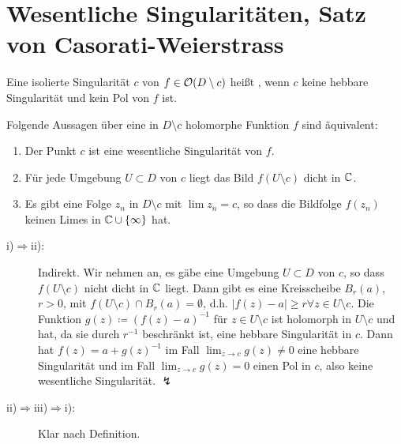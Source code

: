 \section{Wesentliche Singularit\"aten, Satz von Casorati-Weierstrass}
\begin{definition}
	Eine isolierte Singularit\"at $ c $ von $ f\in\mathcal O(D\setminus c) $ hei\ss t , wenn $ c $ keine hebbare Singularit\"at und kein Pol von $ f $ ist.
\end{definition}
\begin{satz}
	Folgende Aussagen \"uber eine in $ D\setminus c $ holomorphe Funktion $ f $ sind \"aquivalent:
	\begin{enumerate}
		\item Der Punkt $ c $ ist eine wesentliche Singularit\"at von $ f $.
		\item F\"ur jede Umgebung $ U\subset D $ von $ c $ liegt das Bild $ f(U\setminus c) $ dicht in $ \mathbb{C} $.
		\item Es gibt eine Folge $ z_n $ in $ D\setminus c $ mit $ \lim z_n=c $, so dass die Bildfolge $ f(z_n) $ keinen Limes in $ \mathbb{C}\cup\lbrace\infty\rbrace $ hat.  
	\end{enumerate} 
\end{satz}
\begin{beweis}
	\begin{description}
		\item[i)$ \Rightarrow $ii):] Indirekt. Wir nehmen an, es g\"abe eine Umgebung $ U\subset D $ von $ c $, so dass $ f(U\setminus c) $ nicht dicht in $ \mathbb{C} $ liegt. Dann gibt es eine Kreisscheibe $ B_r(a) $, $ r>0 $, mit $ f(U\setminus c)\cap B_r(a)=\emptyset $, d.h. $ |f(z)-a|\geq r\forall z\in U\setminus c $. Die Funktion $ g(z)\coloneqq (f(z)-a)^{-1} $ f\"ur $ z\in U\setminus c $ ist holomorph in $ U\setminus c $ und hat, da sie durch $ r^{-1} $ beschr\"ankt ist, eine hebbare Singularit\"at in $ c $. Dann hat $ f(z)=a+g(z)^{-1} $ im Fall $ \lim_{z\to c} g(z)\neq 0 $ eine hebbare Singularit\"at und im Fall $ \lim_{z\to c}g(z)=0 $ einen Pol in $ c $, also keine wesentliche Singularit\"at. $ \lightning $
		\item[ii)$ \Rightarrow $iii)$ \Rightarrow $i):] Klar nach Definition.  
	\end{description}
\end{beweis}
